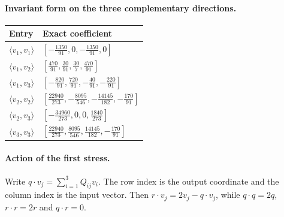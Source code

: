 \paragraph{Invariant form on the three complementary directions.}
\begin{longtable}{@{}ll@{}}
\toprule
Entry&Exact coefficient\\
\midrule\endhead
$\langle v_1,v_1\rangle$&$[-\frac{1350}{91},0,-\frac{1350}{91},0]$\\[3pt]
$\langle v_1,v_2\rangle$&$[\frac{470}{91},\frac{30}{91},\frac{30}{7},\frac{470}{91}]$\\[3pt]
$\langle v_1,v_3\rangle$&$[-\frac{820}{91},\frac{720}{91},-\frac{40}{91},-\frac{220}{91}]$\\[3pt]
$\langle v_2,v_2\rangle$&$[\frac{22940}{273},-\frac{8095}{546},-\frac{14145}{182},-\frac{170}{91}]$\\[3pt]
$\langle v_2,v_3\rangle$&$[-\frac{34960}{273},0,0,\frac{1840}{273}]$\\[3pt]
$\langle v_3,v_3\rangle$&$[\frac{22940}{273},\frac{8095}{546},\frac{14145}{182},-\frac{170}{91}]$\\[3pt]
\bottomrule
\end{longtable}
\paragraph{Action of the first stress.}
Write $q\cdot v_j=\sum_{i=1}^3Q_{ij}v_i$.
The row index is the output coordinate and the column index is the
input vector. Then $r\cdot v_j=2v_j-q\cdot v_j$, while
$q\cdot q=2q$, $r\cdot r=2r$ and $q\cdot r=0$.
